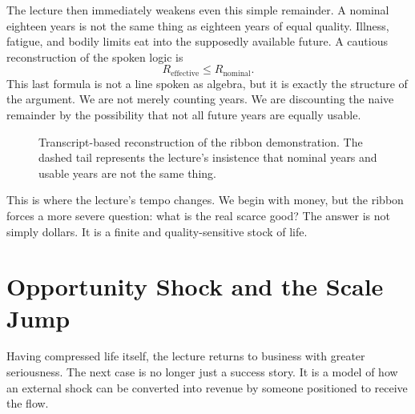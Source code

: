The lecture then immediately weakens even this simple remainder. A nominal eighteen years is not the same thing as eighteen years of equal quality. Illness, fatigue, and bodily limits eat into the supposedly available future. A cautious reconstruction of the spoken logic is
\begin{equation}
R_{\text{effective}} \le R_{\text{nominal}}.
\end{equation}
This last formula is not a line spoken as algebra, but it is exactly the structure of the argument. We are not merely counting years. We are discounting the naive remainder by the possibility that not all future years are equally usable.

\begin{figure}[h]
\centering
{}
\caption{Transcript-based reconstruction of the ribbon demonstration. The dashed tail represents the lecture's insistence that nominal years and usable years are not the same thing.}
\end{figure}

This is where the lecture's tempo changes. We begin with money, but the ribbon forces a more severe question: what is the real scarce good? The answer is not simply dollars. It is a finite and quality-sensitive stock of life.

\section{Opportunity Shock and the Scale Jump}

Having compressed life itself, the lecture returns to business with greater seriousness. The next case is no longer just a success story. It is a model of how an external shock can be converted into revenue by someone positioned to receive the flow.

